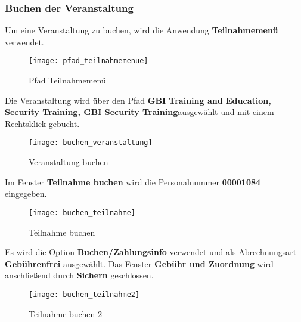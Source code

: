 \subsubsection{Buchen der Veranstaltung}
Um eine Veranstaltung zu buchen, wird die Anwendung \textbf{Teilnahmemenü} verwendet.
\begin{figure}[H]
	\centering
	\texttt{[image: pfad\_teilnahmemenue]}
	\caption{Pfad Teilnahmemenü}
	\label{fig:pfad_teilnahmemenue}
\end{figure}
Die Veranstaltung wird über den Pfad \textbf{GBI Training and Education, Security Training, GBI Security Training}ausgewählt und mit einem Rechtsklick gebucht.
\begin{figure}[H]
	\centering
	\texttt{[image: buchen\_veranstaltung]}
	\caption{Veranstaltung buchen}
	\label{fig:buchen_veranstaltung}
\end{figure}
Im Fenster \textbf{Teilnahme buchen} wird die Personalnummer \textbf{00001084} eingegeben.
\begin{figure}[H]
	\centering
	\texttt{[image: buchen\_teilnahme]}
	\caption{Teilnahme buchen}
	\label{fig:buchen_teilnahme}
\end{figure}
Es wird die Option \textbf{Buchen/Zahlungsinfo} verwendet und als Abrechnungsart \textbf{Gebührenfrei} ausgewählt. Das Fenster \textbf{Gebühr und Zuordnung} wird anschließend durch \textbf{Sichern} geschlossen. 
\begin{figure}[H]
	\centering
	\texttt{[image: buchen\_teilnahme2]}
	\caption{Teilnahme buchen 2}
	\label{fig:buchen_teilnahme2}
\end{figure}

